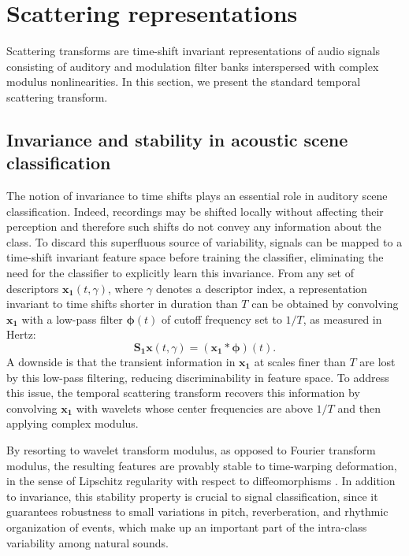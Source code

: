 \documentclass[journal]{IEEEtran}
\begin{document}
\section{Scattering representations \label{sec:scattering}}

Scattering transforms are time-shift invariant representations of audio signals consisting of auditory and modulation filter banks interspersed with complex modulus nonlinearities. In this section, we present the standard temporal scattering transform.

\subsection{Invariance and stability in acoustic scene classification}
The notion of invariance to time shifts plays an essential role in auditory scene classification.
Indeed, recordings may be shifted locally without affecting their perception and therefore such shifts do not convey any information about the class.
To discard this superfluous source of variability, signals can be mapped to a time-shift invariant feature space before training the classifier, eliminating the need for the classifier to explicitly learn this invariance.
From any set of descriptors $\boldsymbol{x_1}(t,\gamma)$, where $\gamma$ denotes a descriptor index, a representation invariant to time shifts shorter in duration than $T$ can be obtained by convolving $\boldsymbol{x_1}$ with a low-pass filter $\boldsymbol{\phi}(t)$ of cutoff frequency set to $1/T$, as measured in Hertz:
\begin{equation}
\mathbf{S_1}\boldsymbol{x}(t, \gamma) = (\boldsymbol{x_1} \ast \boldsymbol{\phi}) (t).
\end{equation}
A downside is that the transient information in $\boldsymbol{x_1}$ at scales finer than $T$ are lost by this low-pass filtering, reducing discriminability in feature space.
To address this issue, the temporal scattering transform recovers this information by convolving $\boldsymbol{x_1}$ with wavelets whose center frequencies are above $1/T$ and then applying complex modulus.

By resorting to wavelet transform modulus, as opposed to Fourier transform modulus, the resulting features are provably stable to time-warping deformation,
in the sense of Lipschitz regularity with respect to diffeomorphisms \cite{Mallat2012}.
In addition to invariance, this stability property is crucial to signal classification, since it guarantees robustness to small variations in pitch, reverberation, and rhythmic organization of events, which make up an important part of the intra-class variability among natural sounds.
\end{document}
